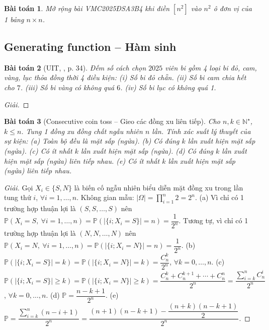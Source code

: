 \documentclass{article}
\newtheorem{baitoan}{Bài toán}
\begin{document}
\begin{baitoan}
	Mở rộng bài VMC2025ĐSA3B4 khi điền $[n^2]$ vào $n^2$ ô đơn vị của 1 bảng $n\times n$.
\end{baitoan}


\subsection{Generating function -- Hàm sinh}

\begin{baitoan}[UIT, \cite{VMS_VMC2025}, p. 34]
	Đếm số cách chọn $2025$ viên bi gồm 4 loại bi đỏ, cam, vàng, lục thỏa đồng thời 4 điều kiện: (i) Số bi đỏ chẵn. (ii) Số bi cam chia hết cho $7$. (iii) Số bi vàng có không quá $6$. (iv) Số bi lục có không quá 1.
\end{baitoan}

\begin{proof}[Giải]
	
\end{proof}


\begin{baitoan}[Consecutive coin toss -- Gieo các đồng xu liên tiếp]
	Cho $n,k\in\mathbb{N}^\star$, $k\le n$. Tung 1 đồng xu đồng chất ngẫu nhiên $n$ lần. Tính xác suất lý thuyết của sự kiện: (a) Toàn bộ đều là mặt sấp (ngửa). (b) Có đúng $k$ lần xuất hiện mặt sấp (ngửa). (c) Có ít nhất $k$ lần xuất hiện mặt sấp (ngửa). (d) Có đúng $k$ lần xuất hiện mặt sấp (ngửa) liên tiếp nhau. (e) Có ít nhất $k$ lần xuất hiện mặt sấp (ngửa) liên tiếp nhau.
\end{baitoan}

\begin{proof}[Giải]
	Gọi $X_i\in\{S,N\}$ là biến cố ngẫu nhiên biểu diễn mặt đồng xu trong lần tung thứ $i$, $\forall i = 1,\ldots,n$. Không gian mẫu: $|\Omega| = \prod_{i=1}^n 2 = 2^n$. (a) Vì chỉ có 1 trường hợp thuận lợi là $(S,S,\ldots,S)$ nên $\mathbb{P}(X_i = S,\ \forall i = 1,\ldots,n) = \mathbb{P}(|\{i;X_i = S\}| = n) = \dfrac{1}{2^n}$. Tương tự, vì chỉ có 1 trường hợp thuận lợi là $(N,N,\ldots,N)$ nên $\mathbb{P}(X_i = N,\ \forall i = 1,\ldots,n) = \mathbb{P}(|\{i;X_i = N\}| = n) = \dfrac{1}{2^n}$. (b) $\mathbb{P}(|\{i;X_i = S\}| = k) = \mathbb{P}(|\{i;X_i = N\}| = k) = \dfrac{C_n^k}{2^n}$, $\forall k = 0,\ldots,n$. (c) $\mathbb{P}(|\{i;X_i = S\}|\ge k) = \mathbb{P}(|\{i;X_i = N\}|\ge k) = \dfrac{C_n^k + C_n^{k+1} + \cdots + C_n^n}{2^n} = \dfrac{\sum_{i=k}^n C_n^i}{2^n}$, $\forall k = 0,\ldots,n$. (d) $\mathbb{P} = \dfrac{n - k + 1}{2^n}$. (e) $\mathbb{P} = \dfrac{\sum_{i=k}^n (n - i + 1)}{2^n} = \dfrac{(n + 1)(n - k + 1) - \dfrac{(n + k)(n - k + 1)}{2}}{2^n}$.
	
\end{proof}
\end{document}
